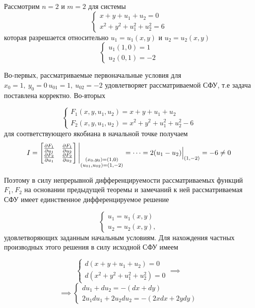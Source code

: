 \documentclass[../../main.tex]{subfiles}
\begin{document}
\begin{exmp}
    Рассмотрим $n = 2$ и $m = 2$ для системы
    \[
    \begin{cases}
        x + y + u_1 + u_2 = 0 \\
        x^2 + y^2 + u_1^2 + u_2^2 = 6
    \end{cases}
    \]
    которая разрешается относительно 
    $u_1 = u_1\left(x, y\right)$ и 
    $u_2 = u_2\left(x, y\right)$
    \[
    \begin{cases}
        u_1\left(1, 0\right) = 1\\
        u_2\left(0, 1\right) = -2
    \end{cases}
    \]
    
    Во-первых, рассматриваемые первоначальные условия для
    $x_0 = 1,\ y_0=0\ u_{01} = 1,\ u_{02} = -2$
    удовлетворяет рассматриваемой СФУ, т.е задача 
    поставлена корректно.
    Во-вторых
    
    \[
    \begin{cases}
        F_1(x, y, u_1, u_2) = x + y + u_1 + u_2 \\
        F_2(x, y, u_1, u_2) = x^2 + y^2 + u_1^2 + u_2^2 - 6
    \end{cases}     
    \]
    для соответствующего якобиана в начальной точке 
    получаем
    \[
    I = \begin{bmatrix}
        \frac{\partial F_1}{\partial u_1} & \frac{\partial F_1}{\partial u_2} \\
        \frac{\partial F_2}{\partial u_1} & \frac{\partial F_2}{\partial u_2}
    \end{bmatrix}
    \Bigg|_{
    	\substack{
    		(x_0,y_0) = (1,0)\\
    		(u_{01},u_{02}) = (1,-2)
    	}} = \dots =  2(u_1 - u_2) \Big|_{(1, -2)} = -6 \neq 0
    \]
    
    Поэтому в силу непрерывной дифференцируемости рассматриваемых
    функций $F_1\text{,}\ F_2$ на основании
    предыдущей теоремы и замечаний к ней 
    рассматриваемая СФУ имеет единственное 
    дифференцируемое решение
    
    \[
    \begin{cases}
        u_1 = u_1\left(x, y\right) \\
        u_2 = u_2\left(x, y\right), 
    \end{cases} 
    \]
    удовлетворяющих заданным начальным условиям.
    Для нахождения частных производных этого решения 
    в силу исходной СФУ имеем
    
    \[
    \begin{cases}
        d\left(x + y + u_1 + u_2\right) = 0 \\
        d\left(x^2 + y^2 + u_1^2 + u_2^2\right) = 0
    \end{cases} \implies
    \]
    \[
    \implies
    \begin{cases}
        du_1 + du_2 = -\left(dx + dy\right)\\
        2u_1du_1 + 2u_2du_2 = -\left(2xdx + 2ydy\right)
    \end{cases}
    \]
    

\end{exmp}
\end{document}
